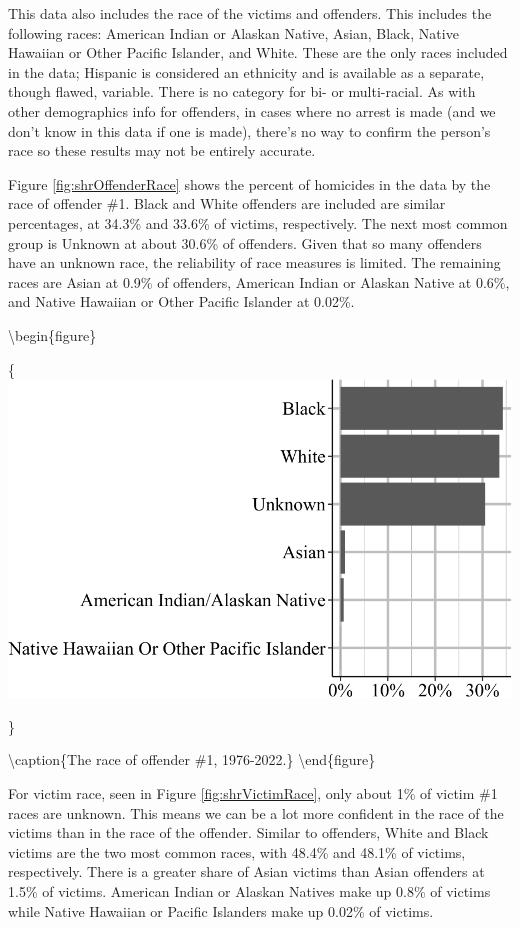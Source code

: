 \documentclass[
  12pt,
  openany]{book}
\begin{document}
This data also includes the race of the victims and offenders. This includes the following races: American Indian or Alaskan Native, Asian, Black, Native Hawaiian or Other Pacific Islander, and White. These are the only races included in the data; Hispanic is considered an ethnicity and is available as a separate, though flawed, variable. There is no category for bi- or multi-racial. As with other demographics info for offenders, in cases where no arrest is made (and we don't know in this data if one is made), there's no way to confirm the person's race so these results may not be entirely accurate.

Figure \ref{fig:shrOffenderRace} shows the percent of homicides in the data by the race of offender \#1. Black and White offenders are included are similar percentages, at 34.3\% and 33.6\% of victims, respectively. The next most common group is Unknown at about 30.6\% of offenders. Given that so many offenders have an unknown race, the reliability of race measures is limited. The remaining races are Asian at 0.9\% of offenders, American Indian or Alaskan Native at 0.6\%, and Native Hawaiian or Other Pacific Islander at 0.02\%.

\textbackslash begin\{figure\}

\{\centering \includegraphics[width=0.9\linewidth]{06_shr_files/figure-latex/shrOffenderRace-1}

\}

\textbackslash caption\{The race of offender \#1, 1976-2022.\}\label{fig:shrOffenderRace}
\textbackslash end\{figure\}

For victim race, seen in Figure \ref{fig:shrVictimRace}, only about 1\% of victim \#1 races are unknown. This means we can be a lot more confident in the race of the victims than in the race of the offender. Similar to offenders, White and Black victims are the two most common races, with 48.4\% and 48.1\% of victims, respectively. There is a greater share of Asian victims than Asian offenders at 1.5\% of victims. American Indian or Alaskan Natives make up 0.8\% of victims while Native Hawaiian or Pacific Islanders make up 0.02\% of victims.
\end{document}
